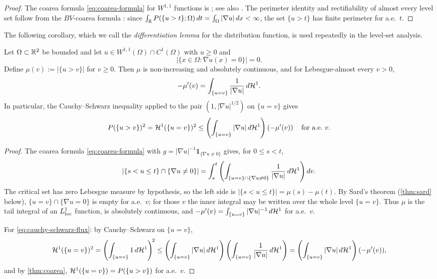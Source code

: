 \begin{proof}
The coarea formula \eqref{eq:coarea-formula} for $W^{1,1}$ functions is
\cite[Theorem~13.1]{Maggi2012}; see also
\cite[Section~3.4, Theorem~3.13]{EvansGariepy2015}.  The perimeter identity and
rectifiability of almost every level set follow from the $BV$-coarea formula
\cite[Theorem~3.40]{AFP2000}: since
$\int_{\mathbb{R}}P(\{u>t\};\Omega)\,dt = \int_\Omega|\nabla u|\,dx < \infty$, the
set $\{u>t\}$ has finite perimeter for a.e.\ $t$.
\end{proof}

The following corollary, which we call the \emph{differentiation lemma} for the
distribution function, is used repeatedly in the level-set analysis.

\begin{lemma}\label{lem:dist-deriv}
Let $\Omega\subset\mathbb{R}^2$ be bounded and let
$u\in W^{1,1}(\Omega)\cap C^1(\Omega)$ with $u\ge0$ and
\[
  |\{x\in\Omega:\nabla u(x)=0\}|=0 .
\]
Define $\mu(v):=|\{u>v\}|$ for $v\ge 0$.  Then $\mu$ is
non-increasing and absolutely continuous, and for Lebesgue-almost every $v>0$,
\begin{equation}\label{eq:dist-deriv}
  -\mu'(v) = \int_{\{u=v\}} \frac{1}{|\nabla u|}\,d\mathcal{H}^1.
\end{equation}
In particular, the Cauchy--Schwarz inequality applied to the pair
$(1, |\nabla u|^{1/2})$ on $\{u=v\}$ gives
\begin{equation}\label{eq:cauchy-schwarz-flux}
  P(\{u>v\})^2 = \mathcal{H}^1(\{u=v\})^2
  \le \left(\int_{\{u=v\}}|\nabla u|\,d\mathcal{H}^1\right)\left(-\mu'(v)\right)
  \quad \text{for a.e.\ }v.
\end{equation}
\end{lemma}

\begin{proof}
The coarea formula \eqref{eq:coarea-formula} with
$g=|\nabla u|^{-1}\mathbf{1}_{\{\nabla u\ne0\}}$
gives, for $0\le s < t$,
\[
  |\{s < u \le t\}\cap\{\nabla u\ne 0\}|
  = \int_s^t \left(\int_{\{u=v\}\cap\{\nabla u\ne 0\}}\frac{1}{|\nabla u|}\,d\mathcal{H}^1\right)dv.
\]
The critical set has zero Lebesgue measure by hypothesis, so the left side is
$|\{s<u\le t\}|=\mu(s)-\mu(t)$.  By Sard's theorem
(\cref{thm:sard} below), $\{u=v\}\cap\{\nabla u=0\}$ is empty for a.e.\ $v$;
for those $v$ the inner integral may be written over the whole level
$\{u=v\}$.  Thus $\mu$ is the tail integral of an $L^1_{\rm loc}$ function,
is absolutely continuous, and
$-\mu'(v)=\int_{\{u=v\}}|\nabla u|^{-1}\,d\mathcal{H}^1$ for a.e.\ $v$.

For \eqref{eq:cauchy-schwarz-flux}: by Cauchy--Schwarz on $\{u=v\}$,
\[
  \mathcal{H}^1(\{u=v\})^2
  = \left(\int_{\{u=v\}}1\,d\mathcal{H}^1\right)^{\!2}
  \le \left(\int_{\{u=v\}}|\nabla u|\,d\mathcal{H}^1\right)
      \left(\int_{\{u=v\}}\frac{1}{|\nabla u|}\,d\mathcal{H}^1\right)
  = \left(\int_{\{u=v\}}|\nabla u|\,d\mathcal{H}^1\right)(-\mu'(v)),
\]
and by \cref{thm:coarea}, $\mathcal{H}^1(\{u=v\}) = P(\{u>v\})$ for a.e.\ $v$.
\end{proof}

